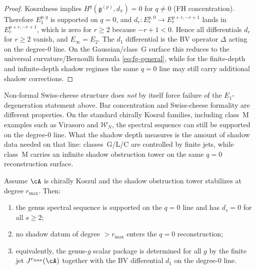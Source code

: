 \begin{proof}
Koszulness implies $H^q(\mathfrak{g}^{(p)}, d_\pi) = 0$ for $q \neq 0$
(FH concentration). Therefore $E_1^{p,q}$ is supported on $q = 0$, and
$d_r: E_r^{p,0} \to E_r^{p+r,-r+1}$ lands in $E_r^{p+r, -r+1}$, which is zero
for $r \geq 2$ because $-r + 1 < 0$. Hence all differentials $d_r$ for $r \geq 2$
vanish, and $E_\infty = E_2$. The $d_1$ differential is the BV operator $\Delta$
acting on the degree-$0$ line. On the Gaussian/class~G surface this reduces to
the universal curvature/Bernoulli formula \eqref{eq:fg-general}, while for the
finite-depth and infinite-depth shadow regimes the same $q=0$ line may still carry
additional shadow corrections.
\end{proof}

\begin{remark}
Non-formal Swiss-cheese structure does \emph{not} by itself force failure of
the $E_1$-degeneration statement above. Bar concentration and Swiss-cheese
formality are different properties. On the standard chirally Koszul families,
including class~M examples such as Virasoro and $\mathcal{W}_N$, the spectral
sequence can still be supported on the degree-$0$ line. What the shadow depth
measures is the amount of shadow data needed on that line: classes~G/L/C are
controlled by finite jets, while class~M carries an infinite shadow obstruction tower on the
same $q=0$ reconstruction surface.
\end{remark}

\begin{proposition}[Finite shadow depth controls the $q=0$ reconstruction; \ClaimStatusProvedHere]
Assume $\cA$ is chirally Koszul and the shadow obstruction tower stabilizes at degree
$r_{\max}$. Then:
\begin{enumerate}[label=\textup{(\roman*)}]
\item the genus spectral sequence is supported on the $q=0$ line and has
 $d_s = 0$ for all $s \geq 2$;
\item no shadow datum of degree $> r_{\max}$ enters the $q=0$ reconstruction;
\item equivalently, the genus-$g$ scalar package is determined for all $g$ by the
 finite jet $J^{r_{\max}}(\cA)$ together with the BV differential $d_1$ on the
 degree-$0$ line.
\end{enumerate}
\end{proposition}

